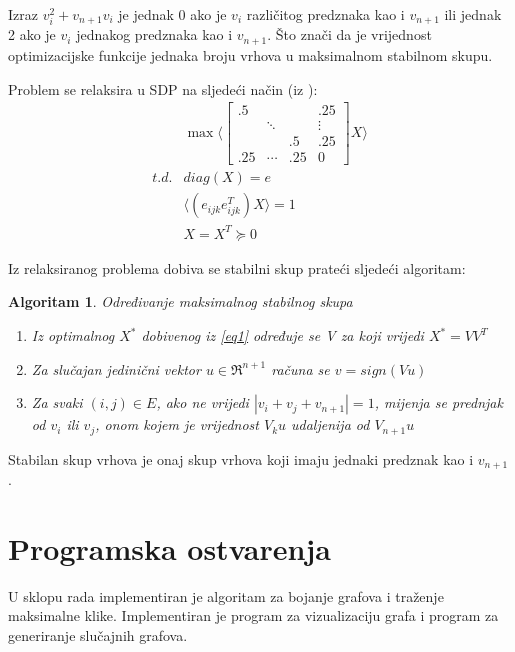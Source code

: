 \documentclass[diplomskirad]{fer}
\newtheorem{algoritam}{Algoritam}
\begin{document}
Izraz $v_i^2+v_{n+1}v_{i}$ je jednak 0 ako je $v_i$ različitog predznaka kao i $v_{n+1}$ ili jednak 2 ako je $v_i$ jednakog predznaka kao i $v_{n+1}$.
Što znači da je vrijednost optimizacijske funkcije jednaka broju vrhova u maksimalnom stabilnom skupu.

Problem se relaksira u SDP na sljedeći način (iz \cite{article}):
\begin{equation} \label{eq1}
  \begin{split}
    & \max \Biggl \langle \begin{bmatrix}
      .5 & & & .25 \\
      & \ddots &  & \vdots \\
      & & .5 & .25 \\
      .25 & \cdots & .25 & 0
    \end{bmatrix} X \Biggr \rangle \\
    t.d. & diag(X) = e \\
    &  \langle (e_{ijk} e_{ijk}^T) X \rangle = 1 \\
    & X = X^T \succeq 0 
  \end{split}
\end{equation}

Iz relaksiranog problema dobiva se stabilni skup prateći sljedeći algoritam:
\begin{algoritam} Određivanje maksimalnog stabilnog skupa
  \label{maks_clique}
  \begin{enumerate}
    \item Iz optimalnog $X^*$ dobivenog iz \ref{eq1} određuje se V za koji vrijedi $X^* = VV^T$
    \item Za slučajan jedinični vektor $u \in \Re^{n+1}$ računa se $v = sign(Vu)$
    \item Za svaki $(i,j) \in E$, ako ne vrijedi $|v_i+v_j+v_{n+1}| = 1$, mijenja se prednjak od $v_i$ ili $v_j$, onom kojem je vrijednost $V_{k}u$ udaljenija od $V_{n+1}u$
  \end{enumerate}
\end{algoritam}

Stabilan skup vrhova je onaj skup vrhova koji imaju jednaki predznak kao i $v_{n+1}$.

\chapter{Programska ostvarenja}
\label{pog:programska_ostvarenja}

U sklopu rada implementiran je algoritam za bojanje grafova i traženje maksimalne klike.
Implementiran je program za vizualizaciju grafa i program za generiranje slučajnih grafova.
\end{document}
